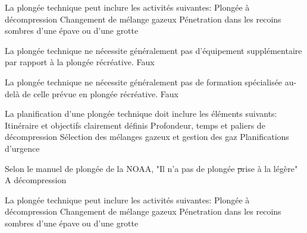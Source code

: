 \begin{frame}{\insertsubsection}
	\begin{outline}
		\1 La plongée technique peut inclure les activités suivantes:
			\2 Plongée à décompression
			\2 Changement de mélange gazeux
			\2 Pénetration dans les recoins sombres d'une épave ou d'une grotte
	\end{outline}
\end{frame}
\begin{frame}{\insertsubsection}
	\begin{outline}
		\1 La plongée technique ne nécessite généralement pas d'équipement supplémentaire par rapport à la plongée récréative.
			\2 Faux
	\end{outline}
\end{frame}
\begin{frame}{\insertsubsection}
	\begin{outline}
		\1 La plongée technique ne nécessite généralement pas de formation spécialisée au-delà de celle prévue en plongée récréative.
			\2 Faux
	\end{outline}
\end{frame}
\begin{frame}{\insertsubsection}
	\begin{outline}
		\1 La planification d'une plongée technique doit inclure les éléments suivants:
			\2 Itinéraire et objectifs clairement définis
			\2 Profondeur, temps et paliers de décompression
			\2 Sélection des mélanges gazeux et gestion des gaz
			\2 Planifications d'urgence
	\end{outline}
\end{frame}
\begin{frame}{\insertsubsection}
	\begin{outline}
		\1 Selon le manuel de plongée de la NOAA, "Il n'a pas de plongée \st prise à la légère"
			\2 A décompression
	\end{outline}
\end{frame}
\begin{frame}{\insertsubsection}
	\begin{outline}
		\1 La plongée technique peut inclure les activités suivantes:
			\2 Plongée à décompression
			\2 Changement de mélange gazeux
			\2 Pénetration dans les recoins sombres d'une épave ou d'une grotte
	\end{outline}
\end{frame}